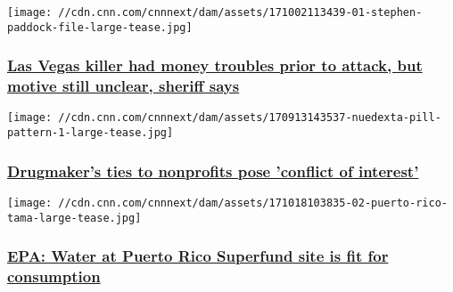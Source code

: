 \href{/2017/11/03/us/las-vegas-shooter-money-troubles-motive-unclear-invs/index.html}{}

\texttt{[image: //cdn.cnn.com/cnnnext/dam/assets/171002113439-01-stephen-paddock-file-large-tease.jpg]}

\hypertarget{las-vegas-killer-had-money-troubles-prior-to-attack-but-motive-still-unclear-sheriff-says}{%
\subsubsection{\texorpdfstring{\href{/2017/11/03/us/las-vegas-shooter-money-troubles-motive-unclear-invs/index.html}{Las
Vegas killer had money troubles prior to attack, but motive still
unclear, sheriff
says}}{Las Vegas killer had money troubles prior to attack, but motive still unclear, sheriff says}}\label{las-vegas-killer-had-money-troubles-prior-to-attack-but-motive-still-unclear-sheriff-says}}

\href{/2017/11/02/health/avanir-nuedexta-nonprofits-invs/index.html}{}

\texttt{[image: //cdn.cnn.com/cnnnext/dam/assets/170913143537-nuedexta-pill-pattern-1-large-tease.jpg]}

\hypertarget{drugmakers-ties-to-nonprofits-pose-conflict-of-interest-}{%
\subsubsection{\texorpdfstring{\href{/2017/11/02/health/avanir-nuedexta-nonprofits-invs/index.html}{Drugmaker's
ties to nonprofits pose 'conflict of interest'
}}{Drugmaker's ties to nonprofits pose 'conflict of interest' }}\label{drugmakers-ties-to-nonprofits-pose-conflict-of-interest-}}

\href{/2017/10/31/health/puerto-rico-water-epa-superfund-test-results/index.html}{}

\texttt{[image: //cdn.cnn.com/cnnnext/dam/assets/171018103835-02-puerto-rico-tama-large-tease.jpg]}

\hypertarget{epa-water-at-puerto-rico-superfund-site-is-fit-for-consumption}{%
\subsubsection{\texorpdfstring{\href{/2017/10/31/health/puerto-rico-water-epa-superfund-test-results/index.html}{EPA:
Water at Puerto Rico Superfund site is fit for
consumption}}{EPA: Water at Puerto Rico Superfund site is fit for consumption}}\label{epa-water-at-puerto-rico-superfund-site-is-fit-for-consumption}}

